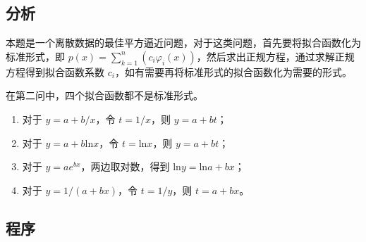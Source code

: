 \subsection{分析}

本题是一个离散数据的最佳平方逼近问题，对于这类问题，首先要将拟合函数化为标准形式，即 $p(x)=\sum\limits_{k=1}^{n}(c_i \varphi_i(x))$，然后求出正规方程，通过求解正规方程得到拟合函数系数 $c_i$，如有需要再将标准形式的拟合函数化为需要的形式。

在第二问中，四个拟合函数都不是标准形式。

\begin{enumerate}
    \item 对于 $y=a+{b}/{x}$，令 $t = 1/x$，则 $y = a+bt$；
    \item 对于 $y=a+b\mathrm{ln}x$，令 $t = \mathrm{ln}x$，则 $y = a+bt$；
    \item 对于 $y=ae^{bx}$，两边取对数，得到 $\mathrm{ln}y = \mathrm{ln}a + bx$；
    \item 对于 $y={1}/(a+bx)$，令 $t = 1/y$，则 $t = a+bx$。
\end{enumerate}

\subsection{程序}


